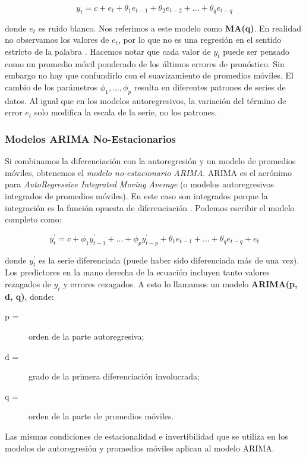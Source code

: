 \[ y_{t} = c + e_{t} + \theta_{1}e_{t-1} + \theta_{2}e_{t-2} + \ldots + \theta_{q}e_{t-q} \]

donde $e_{t}$ es ruido blanco. Nos referimos a este modelo como \textbf{MA(q)}. En realidad no observamos los valores de $e_{t}$, por lo que no es una regresión en el sentido estricto de la palabra \cite{hyndman}. Hacemos notar que cada valor de $y_{t}$ puede ser pensado como un promedio móvil ponderado de los últimos errores de pronóstico. Sin embargo no hay que confundirlo con el suavizamiento de promedios móviles. El cambio de los parámetros $\phi_1, \ldots, \phi_{p}$ resulta en diferentes patrones de series de datos. Al igual que en los modelos autoregresivos, la variación del término de error $e_t$ solo modifica la escala de la serie, no los patrones.

\subsubsection{Modelos ARIMA No-Estacionarios}
Si combinamos la diferenciación con la autoregresión y un modelo de promedios móviles, obtenemos el \emph{modelo no-estacionario ARIMA}. ARIMA es el acrónimo para \emph{AutoRegressive Integrated Moving Average} (o modelos autoregresivos integrados de promedios móviles). En este caso son integrados porque la integración es la función opuesta de diferenciación \cite{hyndman}. Podemos escribir el modelo completo como:

\[ y_{t}^{\prime} = c + \phi_{1}y_{t-1}^{\prime} + \ldots + \phi_{p}y_{t-p}^{\prime} + \theta_{1}e_{t-1} + \ldots + \theta_{q}e_{t-q} + e_{t} \]

donde $y_{t}^{\prime}$ es la serie diferenciada (puede haber sido diferenciada más de una vez). Los predictores en la mano derecha de la ecuación incluyen tanto valores rezagados de $y_t$ y errores rezagados. A esto lo llamamos un modelo \textbf{ARIMA(p, d, q)}, donde:

\begin{description}
  \item [p = ]
  orden de la parte autoregresiva;
  \item [d = ]
  grado de la primera diferenciación involucrada; 
  \item [q = ]
  orden de la parte de promedios móviles.
\end{description}

Las mismas condiciones de estacionalidad e invertibilidad que se utiliza en los modelos de autoregresión y promedios móviles aplican al modelo ARIMA. 

